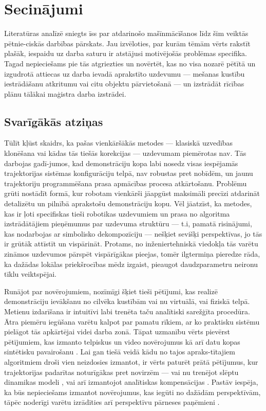 \documentclass[12pt, a4paper]{article}
\numberwithin{equation}{section} %
\begin{document}
\newpage
\section{Secinājumi}

Literatūras analīzē sniegts īss par atdarinošo mašīnmācīšanos līdz šim veiktās pētnie-ciskās darbības pārskats. Jau izvēloties, par kurām tēmām vērts rakstīt plašāk, iespaidu uz darba saturu ir atstājusi motivējošās problēmas specifika. Tagad nepieciešams pie tās atgriezties un novērtēt, kas no visa nozarē pētītā un izgudrotā attiecas uz darba ievadā aprakstīto uzdevumu --- mešanas kustību iestrādāšanu atkritumu vai citu objektu pārvietošanā --- un izstrādāt rīcības plānu tālākai maģistra darba izstrādei.

\subsection{Svarīgākās atziņas}

Tūlīt kļūst skaidrs, ka pašas vienkāršākās metodes --- klasiskā uzvedības klonēšana \cite{pomerleau1989alvinn} vai kādas tās tiešās korekcijas --- uzdevumam piemērotas nav. Tās darbojas gadī-jumos, kad demonstrāciju kopa labi nosedz visas iespējamās trajektorijas sistēmas konfigurāciju telpā, nav robustas pret nobīdēm, un jaunu trajektoriju programmēšana prasa apmācības procesa atkārtošanu. Problēmu grūti nostādīt formā, kur robotam vienkārši jāapgūst maksimāli precīzi atdarināt detalizētu un pilnībā aprakstošu demonstrāciju kopu. Vēl jāatzīst, ka metodes, kas ir ļoti specifiskas tieši robotikas uzdevumiem un prasa no algoritma izstrādātājiem pieņēmumus par uzdevuma struktūru --- t.i, pamatā risinājumi, kas nodarbojas ar simbolisko dekompozīciju \cite{ijspeert2002movement,schaal2003computational, wang2020framework,pastor2011online,pastor2011skill} --- nešķiet sevišķi perspektīvas, jo tās ir grūtāk attīstīt un vispārināt. Protams, no inženiertehniskā viedokļa tās varētu zināmos uzdevumos pārspēt vispārīgākas pieejas, tomēr ilgtermiņa pieredze rāda, ka dažādas lokālas priekšrocības mēdz izgaist, pieaugot daudzparametru neironu tīklu veiktspējai.

Runājot par novērojumiem, nozīmīgi šķiet tieši pētījumi, kas realizē demonstrāciju ievākšanu no cilvēka kustībām \cite{jha2017imitation,zhang2018deep} vai nu virtuālā, vai fiziskā telpā. Metienu izdarīšana ir intuitīvi labi trenēta taču analītiski sarežģīta procedūra. Ātra piemēru iegūšana varētu kalpot par pamatu rīkiem, ar ko praktisku sistēmu pielāgot tās apkārtējai videi darba zonā. Tāpat uzmanību vērts pievērst pētījumiem, kas izmanto telpiskus un video novērojumus kā arī datu kopas sintētisku pavairošanu \cite{dyrstad2018teaching}. Lai gan tiešā veidā kādu no tajos apraks-tītajiem algoritmiem droši vien neizdosies izmantot, ir vērts paturēt prātā pētījumus, kur trajektorijas padarītas noturīgākas pret novirzēm --- vai nu trenējot slēptu dinamikas modeli \cite{torabi2018behavioral}, vai arī izmantojot analītiskas kompensācijas \cite{pastor2011online}. Pastāv iespēja, ka būs nepieciešams izmantot novērojumus, kas iegūti no dažādām perspektīvām, tāpēc noderīgi varētu izrādīties arī perspektīvu pārneses paņēmieni \cite{liu2018imitation}.
\end{document}

